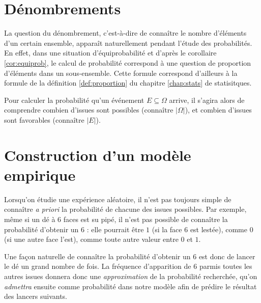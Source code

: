 
\section{Dénombrements}

La question du dénombrement, c'est-à-dire de connaître le nombre d'éléments d'un certain ensemble, apparaît naturellement pendant l'étude des probabilités.
En effet, dans une situation d'équiprobabilité et d'après le corollaire \ref{cor:equiprob}, le calcul de probabilité correspond à une question de proportion d'éléments dans un sous-ensemble.
Cette formule correspond d'ailleurs à la formule de la définition \ref{def:proportion} du chapitre \ref{chap:stats} de statisitques.

Pour calculer la probabilité qu'un événement $E\subseteq\Omega$ arrive, il s'agira alors de comprendre combien d'issues sont possibles (connaître $|\Omega|$), et combien d'issues sont favorables (connaître $|E|$).

\section{Construction d'un modèle empirique}

Lorsqu'on étudie une expérience aléatoire, il n'est pas toujours simple de connaître \emph{a priori} la probabilité de chacune des issues possibles.
Par exemple, même si un dé à $6$ faces est su pipé, il n'est pas possible de connaître la probabilité d'obtenir un $6$ : elle pourrait être $1$ (si la face $6$ est lestée), comme $0$ (si une autre face l'est), comme toute autre valeur entre $0$ et $1$.

Une façon naturelle de connaître la probabilité d'obtenir un $6$ est donc de lancer le dé un grand nombre de fois.
La fréquence d'apparition de $6$ parmis toutes les autres issues donnera donc une \emph{approximation} de la probabilité recherchée, qu'on \emph{admettra} ensuite comme probabilité dans notre modèle afin de prédire le résultat des lancers suivants.

